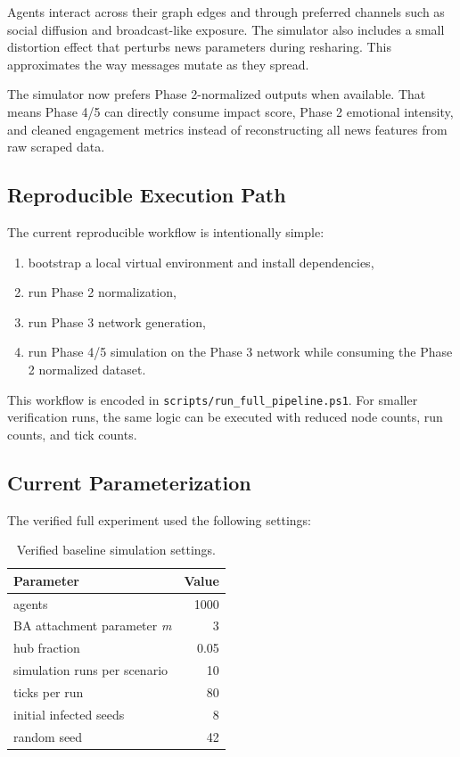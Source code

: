 \documentclass[11pt,a4paper]{article}
\begin{document}
Agents interact across their graph edges and through preferred channels such as social diffusion and broadcast-like exposure. The simulator also includes a small distortion effect that perturbs news parameters during resharing. This approximates the way messages mutate as they spread.

The simulator now prefers Phase 2-normalized outputs when available. That means Phase 4/5 can directly consume impact score, Phase 2 emotional intensity, and cleaned engagement metrics instead of reconstructing all news features from raw scraped data.

\subsection{Reproducible Execution Path}
The current reproducible workflow is intentionally simple:

\begin{enumerate}
  \item bootstrap a local virtual environment and install dependencies,
  \item run Phase 2 normalization,
  \item run Phase 3 network generation,
  \item run Phase 4/5 simulation on the Phase 3 network while consuming the Phase 2 normalized dataset.
\end{enumerate}

This workflow is encoded in \texttt{scripts/run\_full\_pipeline.ps1}. For smaller verification runs, the same logic can be executed with reduced node counts, run counts, and tick counts.

\subsection{Current Parameterization}
The verified full experiment used the following settings:

\begin{table}[h]
\centering
\begin{tabular}{lr}
\toprule
Parameter & Value \\
\midrule
agents & 1000 \\
BA attachment parameter \textit{m} & 3 \\
hub fraction & 0.05 \\
simulation runs per scenario & 10 \\
ticks per run & 80 \\
initial infected seeds & 8 \\
random seed & 42 \\
\bottomrule
\end{tabular}
\caption{Verified baseline simulation settings.}
\end{table}
\end{document}
